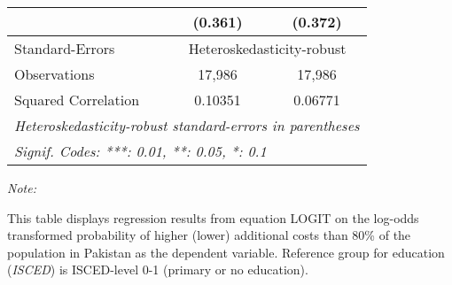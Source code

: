 \begin{table}[htbp!]
\begin{adjustbox}{width = 1\textwidth, max height = 0.95\textheight, center}
\begin{threeparttable}[b]
\begin{tabular}{lcc}
                                 & (0.361)        & (0.372)\\   
            \midrule 
            Standard-Errors & \multicolumn{2}{c}{Heteroskedasticity-robust} \\ 
            Observations         & 17,986         & 17,986\\  
            Squared Correlation  & 0.10351        & 0.06771\\  
            \midrule \midrule
            \multicolumn{3}{l}{\emph{Heteroskedasticity-robust standard-errors in parentheses}}\\
            \multicolumn{3}{l}{\emph{Signif. Codes: ***: 0.01, **: 0.05, *: 0.1}}\\
         \end{tabular}
         
         \begin{tablenotes}\item \medskip \textit{Note:}
            \item This table displays regression results from equation LOGIT on the log-odds transformed probability of higher (lower) additional costs than 80\% of the population in Pakistan as the dependent variable. Reference group for education (\textit{ISCED}) is ISCED-level 0-1 (primary or no education).
         \end{tablenotes}
      \end{threeparttable}
   \end{adjustbox}
\end{table}


